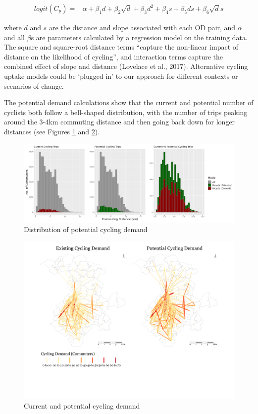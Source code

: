 \documentclass[
]{article}
\begin{document}
\begin{align}\label{eq:pcteqn}
     logit(C_{p}) = & \alpha + \beta_1 d + \beta_2 \sqrt{d} + \beta_3 d^2 + \beta_4 s + \beta_5 ds + \beta_6 \sqrt{d}s 
\end{align}

\noindent where \(d\) and \(s\) are the distance and slope associated with each
OD pair, and \(\alpha\) and all \(\beta\)s are parameters calculated by a regression
model on the training data. The square and square-root distance terms
``capture the non-linear impact of distance on the likelihood of
cycling'', and interaction terms capture the combined effect of slope
and distance (Lovelace et al., 2017). Alternative cycling uptake
models could be `plugged in' to our approach for different contexts or scenarios of change.

The potential demand calculations show that the current and potential
number of cyclists both follow a bell-shaped distribution, with the
number of trips peaking around the 3-4km commuting distance and then
going back down for longer distances (see Figures
\ref{fig:potdemhistograms} and \ref{fig:desirefacetcycling}).

\begin{figure}

{\centering \includegraphics[width=0.9\linewidth]{data/Manchester/Plots/histogram_distance_cycling_potential_current_all} 

}

\caption{Distribution of potential cycling demand}\label{fig:potdemhistograms}
\end{figure}

\begin{figure}[H]

{\centering \includegraphics[width=0.65\linewidth]{data/Manchester/Plots/desire_facet_cycling} 

}

\caption{Current and potential cycling demand}\label{fig:desirefacetcycling}
\end{figure}
\end{document}
